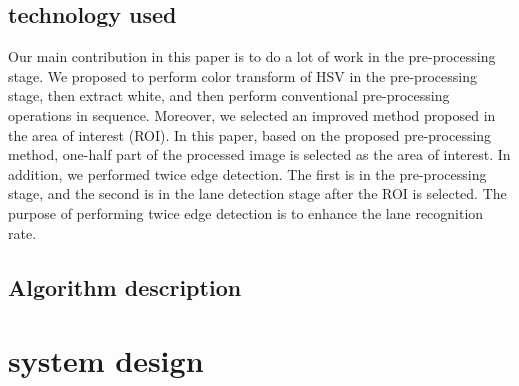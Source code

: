 \documentclass[oneside,a4paper,12pt]{report}
\begin{document}
\section{technology used}
\hspace*{0.3 in}Our main contribution in this paper is to do a lot of work in the pre-processing stage. We proposed to perform color transform of HSV in the pre-processing stage, then extract white, and then perform conventional pre-processing operations in sequence. Moreover, we selected an improved method proposed in the area of interest (ROI). In this paper, based on the proposed pre-processing method, one-half part of the processed image is selected as the area of interest. In addition, we performed twice edge detection. The first is in the pre-processing stage, and the second is in the lane detection stage after the ROI is selected. The purpose of performing twice edge detection is to enhance the lane recognition rate.\\
\section{Algorithm description }

\chapter{system design}
\end{document}
